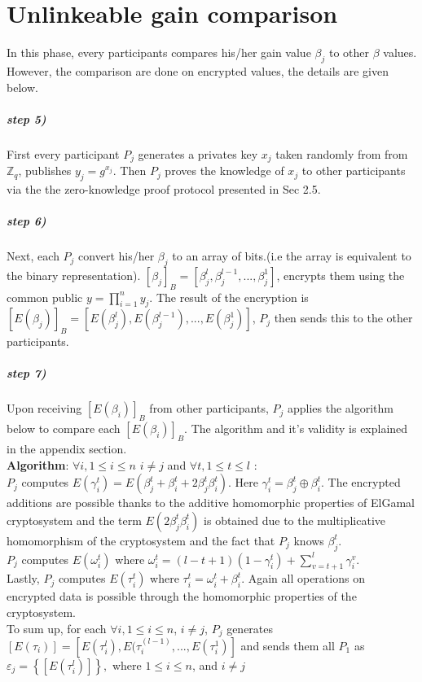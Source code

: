 \documentclass[11pt, a4paper, oneside, openright]{book} %
\begin{document}
\section{Unlinkeable gain comparison}
In this phase, every participants compares his/her gain value $\beta _j$ to other $\beta$ values. However, the comparison are done on encrypted values, the details are given below.\\ 
\subparagraph{ step 5)}
First every participant $P_j$ generates a privates key $x_j$ taken randomly from from $ \mathbb{Z}_q$, publishes $y_j=g^{x_j}$. Then $P_j$  proves the knowledge of $x_j$ to other participants via the the zero-knowledge proof protocol presented in Sec 2.5. 
 \subparagraph{ step 6)}
 Next, each $P_j$ convert his/her $\beta _j$ to an array of bits.(i.e the array is equivalent to the binary representation). $[ \beta _j]_B= [\beta _j^l,\beta _j^{l-1},...,\beta _j^1]$, encrypts them using the common public $y=\prod_{i=1}^ny_j$. The result of the encryption is 
 $[E( \beta _j)]_B = [E( \beta _j^l),E( \beta _j^{l-1}),...,E( \beta _j^1)]$, $P_j$ then sends this to the other participants.\\
 
	
\subparagraph{step 7)}	
	Upon receiving $[E( \beta _i)]_B$ from other participants,  $P_j$ applies the algorithm below to compare each $[E( \beta _i)]_B$. The algorithm and it's validity is explained in the appendix section.\\
	\textbf{Algorithm}: $\forall i, 1 \leq i \leq n$ $i \neq j$ and $ \forall t, 1 \leq t \leq l$ :\\
	$P_j$ computes $E(\gamma _i^t) = E(\beta _j^t +  \beta _i^t + 2\beta _j^t\beta _i^t)$. Here $\gamma _i^t = \beta _j^t \oplus \beta _i^t$. The encrypted additions are possible thanks to the additive homomorphic properties of ElGamal cryptosystem and the term $E(2\beta _j^t\beta _i^t)$ is obtained due to the multiplicative homomorphism of the cryptosystem and the fact that $P_j$ knows $\beta _j^t$.\\
	$P_j$ computes $E(\omega _i^t)$ where $\omega _i^t = (l-t+1)(1-\gamma _i^t) + \sum_{v =t+1}^l \gamma _i^v$.\\
	Lastly, $P_j$ computes $E(\tau _i^t)$ where $\tau _i^t = \omega _i^t +  \beta _i^t$. Again all operations on encrypted data is possible through the homomorphic properties of the cryptosystem.\\
	To sum up, for each $\forall i, 1 \leq i \leq n$, $i \neq j$, $P_j$ generates $[E(\tau _i)] = [E(\tau _i^l),E(\tau _i^{(l-1)},...,E(\tau _i^1)]$ and sends them all $P_1$  as $\varepsilon _j = \left\lbrace [E(\tau _i^l)]\right\rbrace,$ where $ 1 \leq i \leq n$, and $i \neq j$
\end{document}
